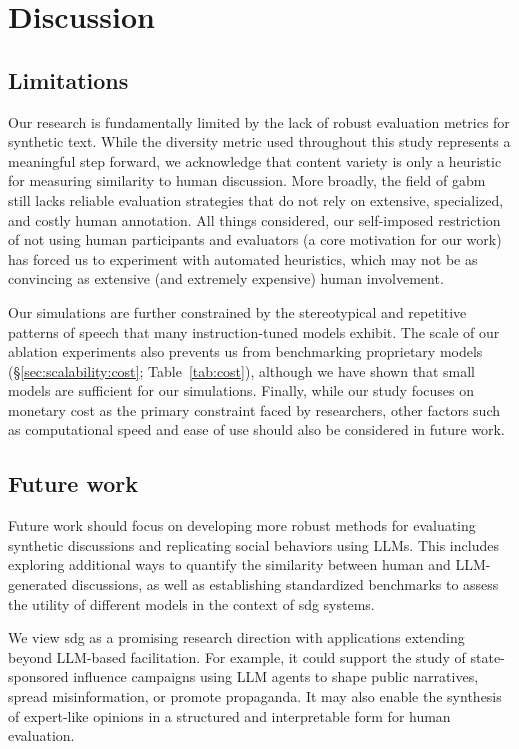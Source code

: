\section{Discussion}

\subsection{Limitations}
Our research is fundamentally limited by the lack of robust evaluation metrics for synthetic text. While the diversity metric used throughout this study represents a meaningful step forward, we acknowledge that content variety is only a heuristic for measuring similarity to human discussion. More broadly, the field of \ac{gabm} still lacks reliable evaluation strategies that do not rely on extensive, specialized, and costly human annotation. All things considered, our self-imposed restriction of not using human participants and evaluators (a core motivation for our work) has forced us to experiment with automated heuristics, which may not be as convincing as extensive (and extremely expensive) human involvement.

Our simulations are further constrained by the stereotypical and repetitive patterns of speech that many instruction-tuned models exhibit. The scale of our ablation experiments also prevents us from benchmarking proprietary models (\S\ref{sec:scalability:cost}; Table~\ref{tab:cost}), although we have shown that small models are sufficient for our simulations. Finally, while our study focuses on monetary cost as the primary constraint faced by researchers, other factors such as computational speed and ease of use should also be considered in future work. 


\subsection{Future work}
Future work should focus on developing more robust methods for evaluating synthetic discussions and replicating social behaviors using LLMs. This includes exploring additional ways to quantify the similarity between human and LLM-generated discussions, as well as establishing standardized benchmarks to assess the utility of different models in the context of \ac{sdg} systems.

We view \ac{sdg} as a promising research direction with applications extending beyond LLM-based facilitation. For example, it could support the study of state-sponsored influence campaigns using LLM agents to shape public narratives, spread misinformation, or promote propaganda. It may also enable the synthesis of expert-like opinions in a structured and interpretable form for human evaluation.

